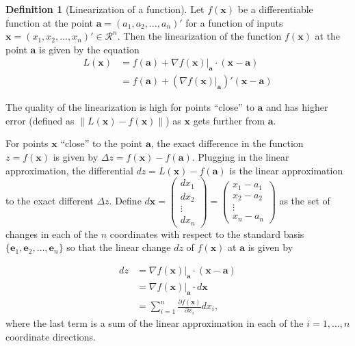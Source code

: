 \documentclass[
]{book}
\theoremstyle{definition}
\newtheorem{definition}{Definition}[chapter]
\theoremstyle{definition}
\theoremstyle{definition}
\theoremstyle{definition}
\theoremstyle{remark}
\begin{document}
\begin{definition}[Linearization of a function]
Let \(f(\mathbf{x})\) be a differentiable function at the point \(\mathbf{a} = (a_1, a_2, \ldots, a_n)'\) for a function of inputs \(\mathbf{x} = (x_1, x_2, \ldots, x_n)' \in \mathcal{R}^n\). Then the linearization of the function \(f(\mathbf{x})\) at the point \(\mathbf{a}\) is given by the equation
\[
\begin{aligned}
L(\mathbf{x}) & = f(\mathbf{a}) + \nabla f(\mathbf{x}) |_{\mathbf{a}} \cdot (\mathbf{x} - \mathbf{a}) \\
& = f(\mathbf{a}) + \left( \nabla f(\mathbf{x}) |_{\mathbf{a}} \right)' (\mathbf{x} - \mathbf{a})
\end{aligned}
\]
\end{definition}

The quality of the linearization is high for points ``close'' to \(\mathbf{a}\) and has higher error (defined as \(\|L(\mathbf{x}) - f(\mathbf{x})\|\)) as \(\mathbf{x}\) gets further from \(\mathbf{a}\).

For points \(\mathbf{x}\) ``close'' to the point \(\mathbf{a}\), the exact difference in the function \(z = f(\mathbf{x})\) is given by \(\Delta z = f(\mathbf{x}) - f(\mathbf{a})\). Plugging in the linear approximation, the differential \(d z = L(\mathbf{x}) - f(\mathbf{a})\) is the linear approximation to the exact different \(\Delta z\). Define \(d \mathbf{x} = \begin{pmatrix} d x_1 \\ d x_2 \\ \vdots \\ d x_n \end{pmatrix} = \begin{pmatrix} x_1 - a_1 \\ x_2 - a_2 \\ \vdots \\ x_n - a_n \end{pmatrix}\) as the set of changes in each of the \(n\) coordinates with respect to the standard basis \(\{\mathbf{e}_1, \mathbf{e}_2, \ldots, \mathbf{e}_n\}\) so that the linear change \(d z\) of \(f(\mathbf{x})\) at \(\mathbf{a}\) is given by

\[
\begin{aligned}
d z & =  \nabla f(\mathbf{x}) |_{\mathbf{a}} \cdot (\mathbf{x} - \mathbf{a}) \\
& = \nabla f(\mathbf{x}) |_{\mathbf{a}} \cdot d \mathbf{x} \\
& = \sum_{i=1}^n \frac{\partial f(\mathbf{x})}{\partial x_i} d x_i,
\end{aligned}
\]
where the last term is a sum of the linear approximation in each of the \(i = 1, \ldots, n\) coordinate directions.
\end{document}
